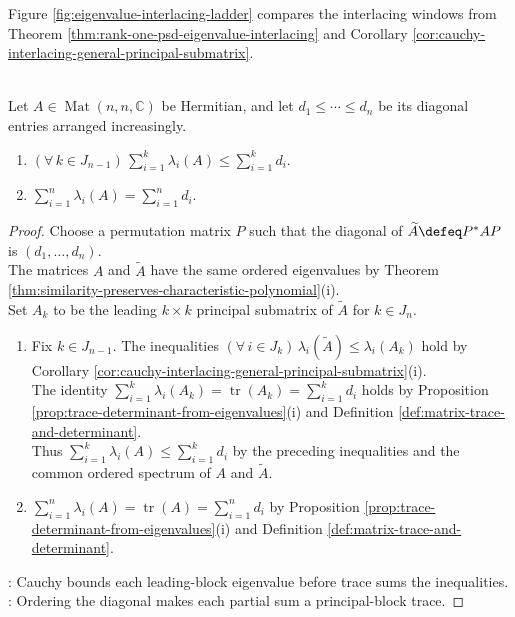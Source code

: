 Figure \ref{fig:eigenvalue-interlacing-ladder} compares the interlacing windows from Theorem \ref{thm:rank-one-psd-eigenvalue-interlacing} and Corollary \ref{cor:cauchy-interlacing-general-principal-submatrix}.

\begin{illustrationfigure}[H]
  \centering
  
  \caption{$\lambda_i(A+E)$ lies in $[\lambda_i(A),\lambda_{i+1}(A)]$, while $\lambda_i(B)$ lies in $[\lambda_i(A),\lambda_{i+m}(A)]$.}
  \label{fig:eigenvalue-interlacing-ladder}
\end{illustrationfigure}

\begin{theorem} \label{thm:schur-majorization-eigenvalues-by-diagonal} \\
Let $A\in\operatorname{Mat}(n,n,\mathbb{C})$ be Hermitian, and let $d_1\leq\cdots\leq d_n$ be its diagonal entries arranged increasingly.
\begin{enumerate}[label=(\roman*)]
\setlength{\itemsep}{0pt}
\item $(\forall\,k\in J_{n-1})\,\sum\limits_{i=1}^{k}\lambda_i(A)\leq\sum\limits_{i=1}^{k}d_i$.
\item $\sum\limits_{i=1}^{n}\lambda_i(A)=\sum\limits_{i=1}^{n}d_i$.
\end{enumerate}
\begin{proof}
Choose a permutation matrix $P$ such that the diagonal of $\widetilde{A}\defeq P^*AP$ is $(d_1,\ldots,d_n)$.\\
The matrices $A$ and $\widetilde{A}$ have the same ordered eigenvalues by Theorem \ref{thm:similarity-preserves-characteristic-polynomial}(i).\\
Set $A_k$ to be the leading $k\times k$ principal submatrix of $\widetilde{A}$ for $k\in J_n$.
\begin{enumerate}[label=(\roman*)]
\setlength{\itemsep}{0pt}
\item Fix $k\in J_{n-1}$. The inequalities $(\forall\,i\in J_k)\,\lambda_i(\widetilde{A})\leq\lambda_i(A_k)$ hold by Corollary \ref{cor:cauchy-interlacing-general-principal-submatrix}(i).\\
The identity $\sum\limits_{i=1}^{k}\lambda_i(A_k)=\operatorname{tr}(A_k)=\sum\limits_{i=1}^{k}d_i$ holds by Proposition \ref{prop:trace-determinant-from-eigenvalues}(i) and Definition \ref{def:matrix-trace-and-determinant}.\\
Thus $\sum\limits_{i=1}^{k}\lambda_i(A)\leq\sum\limits_{i=1}^{k}d_i$ by the preceding inequalities and the common ordered spectrum of $A$ and $\widetilde{A}$.
\item $\sum\limits_{i=1}^{n}\lambda_i(A)=\operatorname{tr}(A)=\sum\limits_{i=1}^{n}d_i$ by Proposition \ref{prop:trace-determinant-from-eigenvalues}(i) and Definition \ref{def:matrix-trace-and-determinant}.
\end{enumerate}
: Cauchy bounds each leading-block eigenvalue before trace sums the inequalities.\\
: Ordering the diagonal makes each partial sum a principal-block trace.
\end{proof}
\end{theorem}


